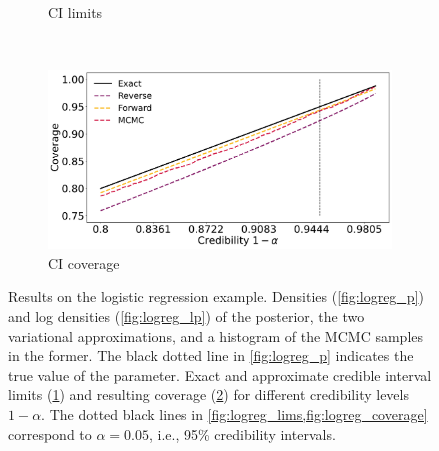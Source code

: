 \begin{figure}[ht]
\begin{subfigure}{\linewidth}
    \caption{CI limits}
    \label{fig:logreg_lims}
    \end{subfigure}\\[1ex]
    \begin{subfigure}{\linewidth}
    \centering
    \includegraphics[width=0.8\linewidth]{fig/logreg_cicoverage.pdf}
    \caption{CI coverage}
    \label{fig:logreg_coverage}
    \end{subfigure}
    \caption{Results on the logistic regression example.
    Densities (\cref{fig:logreg_p}) and log densities (\cref{fig:logreg_lp})
    of the posterior, the two variational approximations,
    and a histogram of the MCMC samples in the former.
    The black dotted line in \cref{fig:logreg_p}
    indicates the true value of the parameter.
    Exact and approximate credible interval limits (\cref{fig:logreg_lims})
    and resulting coverage (\cref{fig:logreg_coverage})
    for different credibility levels $1-\alpha$.
    The dotted black lines in \cref{fig:logreg_lims,fig:logreg_coverage}
    correspond to $\alpha=0.05$, i.e., 95\% credibility intervals.}
    \label{fig:logreg}
\end{figure}
